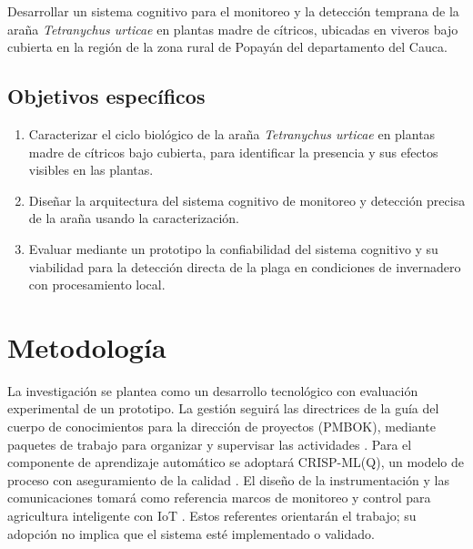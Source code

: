 Desarrollar un sistema cognitivo para el monitoreo y la detección temprana de
la araña \textit{Tetranychus urticae} en plantas madre de cítricos, ubicadas en
viveros bajo cubierta en la región de la zona rural de Popayán del departamento
del Cauca.

\subsection{Objetivos específicos}
\label{subsec:obj-especificos}

\begin{enumerate}
    \item Caracterizar el ciclo biológico de la araña \textit{Tetranychus urticae}
    en plantas madre de cítricos bajo cubierta, para identificar la presencia y
    sus efectos visibles en las plantas.
    \item Diseñar la arquitectura del sistema cognitivo de monitoreo y detección
    precisa de la araña usando la caracterización.
    \item Evaluar mediante un prototipo la confiabilidad del sistema cognitivo y
    su viabilidad para la detección directa de la plaga en condiciones de
    invernadero con procesamiento local.
\end{enumerate}

\section{Metodología}
\label{sec:metodologia}

La investigación se plantea como un desarrollo tecnológico con evaluación
experimental de un prototipo. La gestión seguirá las directrices de la guía
del cuerpo de conocimientos para la dirección de proyectos (PMBOK), mediante
paquetes de trabajo para organizar y supervisar las actividades
\cite{pmi2017pmbok}. Para el componente de aprendizaje automático se adoptará
CRISP-ML(Q), un modelo de proceso con aseguramiento de la calidad
\cite{studer2021crispml}. El diseño de la instrumentación y las comunicaciones
tomará como referencia marcos de monitoreo y control para agricultura
inteligente con IoT \cite{senoo2023iot}. Estos referentes orientarán el trabajo;
su adopción no implica que el sistema esté implementado o validado.

